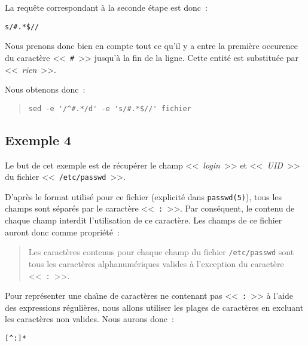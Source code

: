 La requ{\^e}te correspondant {\`a} la seconde {\'e}tape est donc~:
\begin{center}
\verb=s/#.*$//=
\end{center}
Nous prenons donc bien en compte tout ce qu'il y a entre la premi{\`e}re occurence
du caract{\`e}re <<~\verb=#=~>> jusqu'{\`a} la fin de la ligne. Cette entit{\'e} est
substitu{\'e}e par <<~{\sl rien}~>>.

Nous obtenons donc~:
\begin{quote}
\begin{verbatim}
sed -e '/^#.*/d' -e 's/#.*$//' fichier
\end{verbatim}
\end{quote}

\subsection{\label{adv-fltrs-sed-ex4}Exemple 4}

Le but de cet exemple est de r{\'e}cup{\'e}rer le champ <<~{\sl login}~>> et <<~{\sl UID}~>>
du fichier <<~{\tt /etc/passwd}~>>.

D'apr{\`e}s le format utilis{\'e} pour ce fichier (explicit{\'e} dans {\tt passwd(5)}), tous
les champs sont s{\'e}par{\'e}s par le caract{\`e}re <<~{\tt :}~>>. Par cons{\'e}quent,
le contenu de chaque champ interdit l'utilisation de ce caract{\`e}re. Les champs
de ce fichier auront donc comme propri{\'e}t{\'e}~:
\begin{quote}
Les caract{\`e}res contenus pour chaque champ du fichier {\tt /etc/passwd} sont
tous les caract{\`e}res alphanum{\'e}riques valides {\`a} l'exception du caract{\`e}re
<<~{\tt :}~>>.
\end{quote}
Pour repr{\'e}senter une cha{\^\i}ne de caract{\`e}res ne contenant pas <<~{\tt :}~>> {\`a}
l'aide des expressions r{\'e}guli{\`e}res, nous allons utiliser les plages de caract{\`e}res
en excluant les caract{\`e}res non valides. Nous aurons donc~:
\begin{center}
\verb=[^:]*=\\[1ex]
\end{center}


